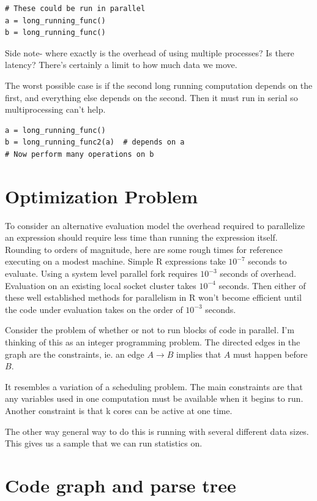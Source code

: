 \documentclass[12pt]{article}
\begin{document}
\begin{verbatim}
# These could be run in parallel
a = long_running_func()
b = long_running_func()
\end{verbatim}

Side note- where exactly is the overhead of using multiple processes? Is
there latency? There's certainly a limit to how much data we move.

The worst possible case is if the second long running computation depends
on the first, and everything else depends on the second. Then it must run
in serial so multiprocessing can't help.

\begin{verbatim}
a = long_running_func()
b = long_running_func2(a)  # depends on a
# Now perform many operations on b
\end{verbatim}

\section{Optimization Problem}

To consider an alternative evaluation model the overhead required to
parallelize an expression should require less time than running the
expression itself. Rounding to orders of magnitude, here are some rough
times
for reference executing on a modest machine. Simple R expressions take
$10^{-7}$ seconds to evaluate. Using a system level parallel fork
requires $10^{-3}$ seconds of overhead. Evaluation on an existing local
socket cluster takes $10^{-4}$ seconds. Then either of these well
established methods for parallelism in R won't become efficient until the
code under evaluation takes on the order of $10^{-3}$ seconds.

Consider the problem of whether or not to run blocks of code in parallel.
I'm thinking of this as an integer programming problem. 
The directed edges in the graph are the constraints, ie. an edge $A
\rightarrow B$ implies that $A$ must happen before $B$.

It resembles a
variation of a scheduling problem. The main constraints are that any variables
used in one computation must be available when it begins to run. Another
constraint is that k cores can be active at one time.

The other way general way to do this is running with several different data sizes. This
gives us a sample that we can run statistics on.

\section{Code graph and parse tree }
\end{document}

